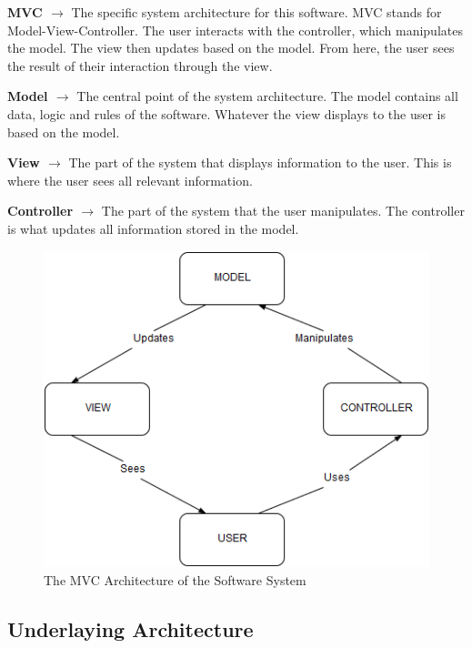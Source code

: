 \documentclass{article}
\begin{document}
\begin{description}[leftmargin=0.2cm]
    \item \textbf{MVC $\rightarrow$} The specific system architecture for this software. MVC stands for Model-View-Controller. The user interacts with the controller, which manipulates the model. The view then updates based on the model. From here, the user sees the result of their interaction through the view.
    \item \textbf{Model $\rightarrow$} The central point of the system architecture. The model contains all data, logic and rules of the software. Whatever the view displays to the user is based on the model.
    \item \textbf{View $\rightarrow$} The part of the system that displays information to the user. This is where the user sees all relevant information.
    \item \textbf{Controller $\rightarrow$} The part of the system that the user manipulates. The controller is what updates all information stored in the model.
    \begin{figure}[H]
        \includegraphics[width=\textwidth]{SystemArchitecture.png}
        \caption{The MVC Architecture of the Software System}
    \end{figure}
\end{description}

\subsection{Underlaying Architecture}
\end{document}
